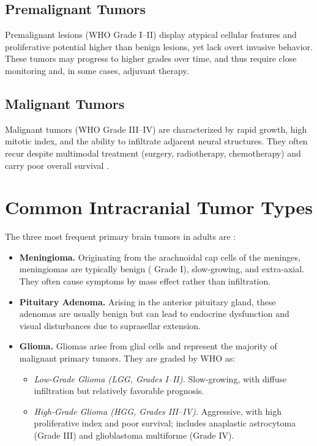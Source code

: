 \subsection{Premalignant Tumors}
Premalignant lesions (WHO Grade I–II) display atypical cellular features and proliferative potential higher than benign lesions, yet lack overt invasive behavior. These tumors may progress to higher grades over time, and thus require close monitoring and, in some cases, adjuvant therapy.

\subsection{Malignant Tumors}
Malignant tumors (WHO Grade III–IV) are characterized by rapid growth, high mitotic index, and the ability to infiltrate adjacent neural structures. They often recur despite multimodal treatment (surgery, radiotherapy, chemotherapy) and carry poor overall survival \cite{ref8}.

\section{Common Intracranial Tumor Types}
\label{sec:common-tumor-types}

The three most frequent primary brain tumors in adults are \cite{naser2020lgmi}:

\begin{itemize}
  \item \textbf{Meningioma.}
        Originating from the arachnoidal cap cells of the meninges, meningiomas are typically benign ( Grade I), slow‐growing, and extra‐axial. They often cause symptoms by mass effect rather than infiltration.

  \item \textbf{Pituitary Adenoma.}
        Arising in the anterior pituitary gland, these adenomas are usually benign but can lead to endocrine dysfunction and visual disturbances due to suprasellar extension.

  \item \textbf{Glioma.}
        Gliomas arise from glial cells and represent the majority of malignant primary  tumors. They are graded by WHO as:
        \begin{itemize}
          \item \emph{Low-Grade Glioma (LGG, Grades I–II).} Slow‐growing, with diffuse infiltration but relatively favorable prognosis.
          \item \emph{High-Grade Glioma (HGG, Grades III–IV).} Aggressive, with high proliferative index and poor survival; includes anaplastic astrocytoma (Grade III) and glioblastoma multiforme (Grade IV).
        \end{itemize}
\end{itemize}

